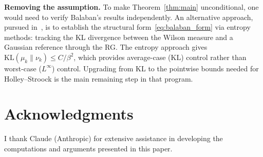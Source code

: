 \documentclass[11pt]{article}
\theoremstyle{definition}
\theoremstyle{remark}
\newcommand{\KL}{\mathrm{KL}}
\begin{document}
\medskip
\textbf{Removing the assumption.}
To make Theorem~\ref{thm:main} unconditional, one would need to 
verify Balaban's results independently.  An alternative approach, 
pursued in~\cite{Fontes2026_entropy}, is to establish the 
structural form~\eqref{eq:balaban_form} via entropy methods: 
tracking the KL divergence between the Wilson measure and a 
Gaussian reference through the RG.  The entropy approach gives 
$\KL(\mu_k \| \nu_k) \leq C/\beta^2$, which provides 
average-case (KL) control rather than worst-case ($L^\infty$) 
control.  Upgrading from KL to the pointwise bounds needed for 
Holley--Stroock is the main remaining step in that program.

\section*{Acknowledgments}

I thank Claude (Anthropic) for extensive assistance in developing 
the computations and arguments presented in this paper.
\end{document}
